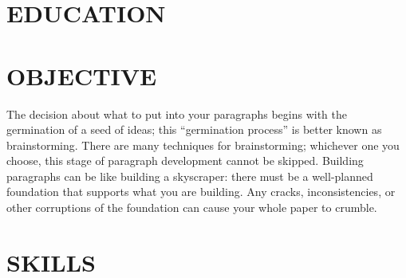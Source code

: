 \documentclass{article}
\begin{document}
\section*{\large{\uppercase{education}}}

\vspace{3pt}
\renewcommand{\labelitemii}{$\circ$}

 
\vspace{3pt}
\section*{\large{\uppercase{objective}}}

\vspace{3pt}
The decision about what to put into your paragraphs begins with the germination of a seed of ideas; this “germination process” is better known as brainstorming. There are many techniques for brainstorming; whichever one you choose, this stage of paragraph development cannot be skipped. Building paragraphs can be like building a skyscraper: there must be a well-planned foundation that supports what you are building. Any cracks, inconsistencies, or other corruptions of the foundation can cause your whole paper to crumble.
\vspace{3pt}

\section*{\large{\uppercase{Skills}}}
\end{document}
